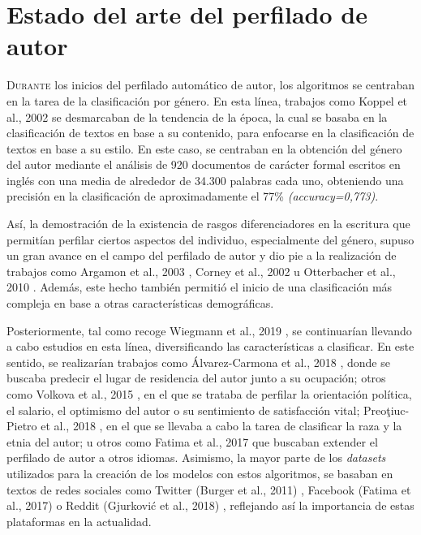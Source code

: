 \chapter{Estado del arte del perfilado de autor}
\label{chap:estadoarte}

\lettrine{D}{urante} los inicios del perfilado automático de autor, los algoritmos se centraban en la tarea de la clasificación por género.
En esta línea, trabajos como Koppel et al., 2002 \cite{koppel2002automatically} se desmarcaban de la tendencia de la época,
la cual se basaba en la clasificación de textos en base a su contenido, para enfocarse en la clasificación de textos en base a su estilo.
En este caso, se centraban en la obtención del género del autor mediante el análisis
de 920 documentos de carácter formal escritos en inglés con una media de alrededor de 34.300 palabras cada uno, obteniendo una precisión en la clasificación de
aproximadamente el 77\% \textit{(accuracy=0,773)}.

\bigskip
Así, la demostración de la existencia de rasgos diferenciadores en la escritura que permitían perfilar ciertos aspectos del individuo, especialmente del género,
supuso un gran avance en el campo del perfilado de autor
y dio pie a la realización de trabajos como Argamon et al., 2003 \cite{argamon2003gender}, Corney et al., 2002 \cite{corney2002gender} u Otterbacher et al., 2010 \cite{otterbacher2010inferring}.
Además, este hecho también permitió el inicio de una clasificación más compleja en base a otras características demográficas.

\bigskip
Posteriormente, tal como recoge Wiegmann et al., 2019 \cite{wiegmann2019overview}, se continuarían llevando a cabo estudios en esta línea, diversificando
las características a clasificar. En este sentido, se realizarían trabajos como Álvarez-Carmona et al., 2018 \cite{alvarez2018overview}, donde se buscaba
predecir el lugar de residencia del autor junto a su ocupación; otros como Volkova et al., 2015 \cite{volkova2015predicting}, en el que se trataba de perfilar la orientación política,
el salario, el optimismo del autor o su sentimiento de satisfacción vital; Preoţiuc-Pietro et al., 2018 \cite{preoctiuc2018user}, en el que se llevaba a cabo la tarea de
clasificar la raza y la etnia del autor; u otros como Fatima et al., 2017 \cite{fatima2017multilingual} que buscaban extender el perfilado de autor a otros idiomas. Asimismo,
la mayor parte de los \textit{datasets} utilizados para la creación de los modelos con estos algoritmos, se basaban en textos de redes sociales como Twitter (Burger et al., 2011) \cite{burger2011discriminating},
Facebook (Fatima et al., 2017) \cite{fatima2017multilingual} o Reddit (Gjurković et al., 2018) \cite{gjurkovic2018reddit}, reflejando así la importancia de estas plataformas
en la actualidad.

